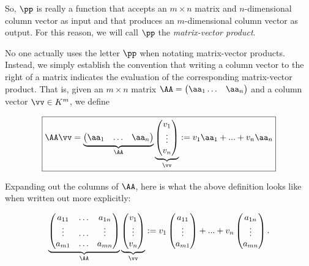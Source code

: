 \begin{deriv}
    So, $\pp$ is really a function that accepts an $m \times n$ matrix and $n$-dimensional column vector as input and that produces an $m$-dimensional column vector as output. For this reason, we will call $\pp$ the \textit{matrix-vector product}.
    
    No one actually uses the letter $\pp$ when notating matrix-vector products. Instead, we simply establish the convention that writing a column vector to the right of a matrix indicates the evaluation of the corresponding matrix-vector product. That is, given an $m \times n$ matrix $\AA = \begin{pmatrix} \aa_1 \hdots & \aa_n \end{pmatrix}$ and a column vector $\vv \in K^m$, we define
    
    \begin{align*}
        \boxed
        {
            \AA \vv =
            \underbrace
            {\begin{pmatrix} 
                \aa_1 & \hdots & \aa_n
            \end{pmatrix}}_\AA
            \underbrace{
            \begin{pmatrix} 
                v_1 \\ \vdots \\ v_n 
            \end{pmatrix}}_\vv
            :=
            v_1 \aa_1 + ... + v_n \aa_n
        }
    \end{align*}
    
    Expanding out the columns of $\AA$, here is what the above definition looks like when written out more explicitly:
    
    \begin{align*}
        \underbrace
        {\begin{pmatrix} 
            a_{11} & \hdots & a_{1n} \\
            \vdots & \hdots & \vdots \\
            a_{m1} & \hdots & a_{mn}
        \end{pmatrix}}_\AA
        \underbrace{
        \begin{pmatrix} 
            v_1 \\ \vdots \\ v_n 
        \end{pmatrix}}_\vv
        :=
        v_1 
        \begin{pmatrix} a_{11} \\ \vdots \\ a_{m1} \end{pmatrix}
        + ... + v_n 
        \begin{pmatrix} a_{1n} \\ \vdots \\ a_{mn} \end{pmatrix}.
    \end{align*}
\end{deriv}

